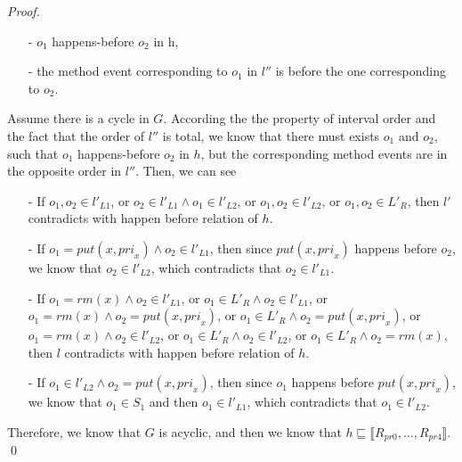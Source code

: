 \documentclass{llncs}
\begin{document}
\begin {proof}
\begin{itemize}
\setlength{\itemsep}{0.5pt}
\item[-] $o_1$ happens-before $o_2$ in h,

\item[-] the method event corresponding to $o_1$ in $l''$ is before the one corresponding to $o_2$.
\end{itemize}

Assume there is a cycle in $G$. According the the property of interval order and the fact that the order of $l''$ is total, we know that there must exists $o_1$ and $o_2$, such that $o_1$ happens-before $o_2$ in $h$, but the corresponding method events are in the opposite order in $l''$. Then, we can see

\begin{itemize}
\setlength{\itemsep}{0.5pt}
\item[-] If $o_1,o_2 \in l'_{L1}$, or $o_2 \in l'_{L1} \wedge o_1 \in l'_{L2}$, or $o_1,o_2 \in l'_{L2}$, or $o_1,o_2 \in L'_R$, then $l'$ contradicts with happen before relation of $h$.

\item[-] If $o_1 = \textit{put}(x,\textit{pri}_x) \wedge o_2 \in l'_{L1}$, then since $\textit{put}(x,\textit{pri}_x)$ happens before $o_2$, we know that $o_2 \in l'_{L2}$, which contradicts that $o_2 \in l'_{L1}$.

\item[-] If $o_1 = \textit{rm}(x) \wedge o_2 \in l'_{L1}$, or $o_1 \in L'_R \wedge o_2 \in l'_{L1}$, or $o_1 = \textit{rm}(x) \wedge o_2 = \textit{put}(x,\textit{pri}_x)$, or $o_1 \in L'_R \wedge o_2 = \textit{put}(x,\textit{pri}_x)$, or $o_1 = \textit{rm}(x) \wedge o_2 \in l'_{L2}$, or $o_1 \in L'_R \wedge o_2 \in l'_{L2}$, or $o_1 \in L'_R \wedge o_2 = \textit{rm}(x)$, then $l$ contradicts with happen before relation of $h$.

\item[-] If $o_1 \in l'_{L2} \wedge o_2 = \textit{put}(x,\textit{pri}_x)$, then since $o_1$ happens before $\textit{put}(x,\textit{pri}_x)$, we know that $o_1 \in S_1$ and then $o_1 \in l'_{L1}$, which contradicts that $o_1 \in l'_{L2}$.
\end{itemize}

Therefore, we know that $G$ is acyclic, and then we know that $h \sqsubseteq \llbracket R_{\textit{pr0}},\ldots,R_{\textit{pr4}} \rrbracket$. \qed

\end {proof}
\end{document}
